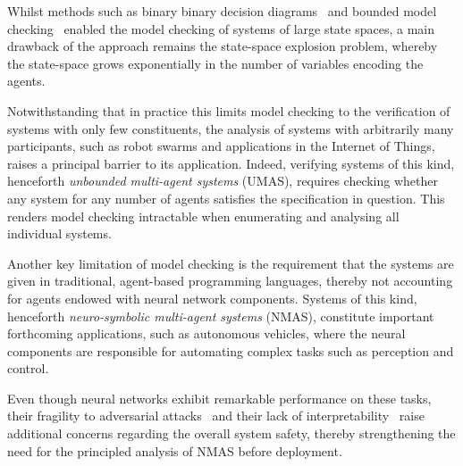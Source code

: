 \documentclass{article}
\begin{document}
Whilst methods such as binary binary decision diagrams~\cite{GammieMeyden04a}
and bounded model checking~\cite{PenczekLomuscio03b}   enabled the  model
checking  of systems of large state spaces, a main drawback of the approach
remains the state-space explosion problem, whereby the state-space grows
exponentially in the number of variables encoding the agents.


Notwithstanding that in practice this limits model checking to the verification
of systems with only few constituents, the analysis of  systems with arbitrarily many
participants, such as robot swarms  and  applications in the Internet of Things, 
raises a principal barrier to its application.  Indeed, 
verifying systems of this kind, henceforth {\em unbounded multi-agent systems}
(UMAS), requires checking whether any system for any number of agents satisfies
the specification in question. This  renders model checking intractable when 
enumerating and analysing all individual systems. 




Another key limitation of model checking is the requirement that the systems are
given in traditional, agent-based programming languages, thereby not accounting for  
 agents endowed with neural network components.
Systems of this kind, henceforth {\em neuro-symbolic multi-agent systems}
(NMAS), constitute important forthcoming applications, such as autonomous
vehicles, where the neural components are responsible for automating complex tasks such
as perception and control. 

Even though neural networks exhibit remarkable performance on these tasks,
their fragility to adversarial attacks~\cite{Szegedy+14} and
their lack of interpretability~\cite{VelizKim17} raise additional concerns
regarding the overall system safety, thereby strengthening the need for the
principled analysis of NMAS before deployment.
\end{document}
